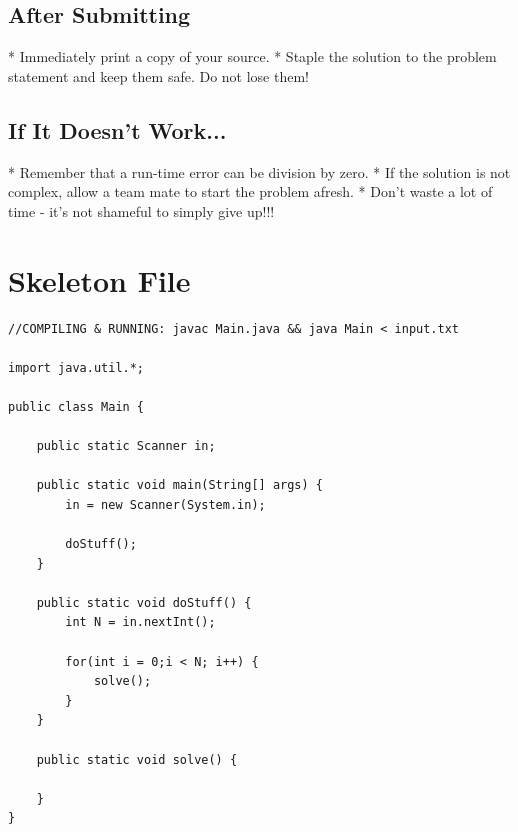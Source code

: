\documentclass{article}
\begin{document}
\subsection*{After Submitting}

* Immediately print a copy of your source.
* Staple the solution to the problem statement and keep them safe.  Do
not lose them!

\subsection*{If It Doesn't Work...}

* Remember that a run-time error can be division by zero.
* If the solution is not complex, allow a team mate to start the
problem afresh.
* Don't waste a lot of time - it's not shameful to simply give up!!!

\clearpage
\section*{Skeleton File}
\begin{verbatim}
//COMPILING & RUNNING: javac Main.java && java Main < input.txt 

import java.util.*;

public class Main {

    public static Scanner in;
 
    public static void main(String[] args) {
        in = new Scanner(System.in);

        doStuff();
    }

    public static void doStuff() {
        int N = in.nextInt();

        for(int i = 0;i < N; i++) {
            solve();
        }
    }

    public static void solve() {

    }
}
\end{verbatim}
\clearpage
\end{document}
